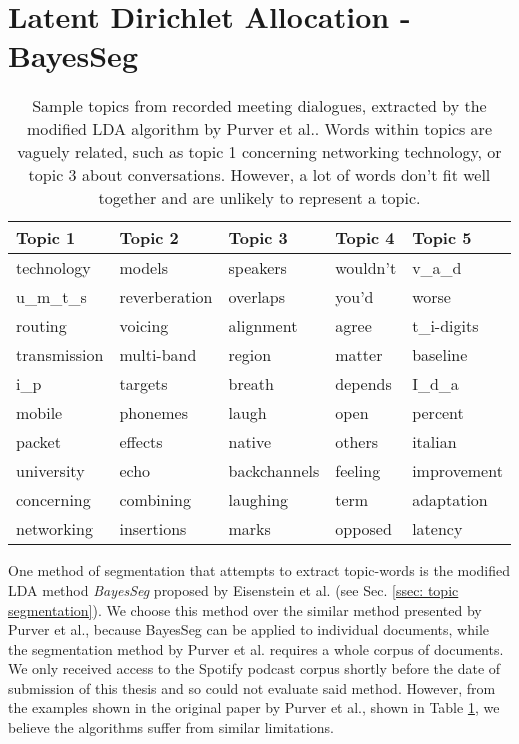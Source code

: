 \section[LDA BayesSeg]{Latent Dirichlet Allocation - BayesSeg \label{method: LDA}} 
    \begin{table}[]
    \centering
    \begin{tabular}{lllll}
    \hline
    \textbf{Topic 1}   & \textbf{Topic 2}    & \textbf{Topic 3}   & \textbf{Topic 4} & \textbf{Topic 5}  \\ \hline
    technology   & models        & speakers     & wouldn't   & v\_a\_d     \\
    u\_m\_t\_s   & reverberation & overlaps     & you'd      & worse       \\
    routing      & voicing       & alignment    & agree      & t\_i-digits \\
    transmission & multi-band    & region       & matter     & baseline    \\
    i\_p         & targets       & breath       & depends    & I\_d\_a     \\
    mobile       & phonemes      & laugh        & open       & percent     \\
    packet       & effects       & native       & others     & italian     \\
    university   & echo          & backchannels & feeling    & improvement \\
    concerning   & combining     & laughing     & term       & adaptation  \\
    networking   & insertions    & marks        & opposed    & latency     \\ \hline
    \end{tabular}
    \caption{Sample topics from recorded meeting dialogues, extracted by the modified LDA algorithm by Purver et al.\cite{purver2006unsupervised}. Words within topics are vaguely related, such as topic 1 concerning networking technology, or topic 3 about conversations. However, a lot of words don't fit well together and are unlikely to represent a topic.}
    \label{table: modified lda topics}
    \end{table}
    
    One method of segmentation that attempts to extract topic-words is the modified LDA method \textit{BayesSeg} proposed by Eisenstein et al.\cite{eisenstein2008bayesian} (see Sec. \ref{ssec: topic segmentation}). We choose this method over the similar method presented by Purver et al.\cite{purver2006unsupervised}, because BayesSeg can be applied to individual documents, while the segmentation method by Purver et al. requires a whole corpus of documents. We only received access to the Spotify podcast corpus shortly before the date of submission of this thesis and so could not evaluate said method. However, from the examples shown in the original paper by Purver et al.\cite{purver2006unsupervised}, shown in Table \ref{table: modified lda topics}, we believe the algorithms suffer from similar limitations.
    

